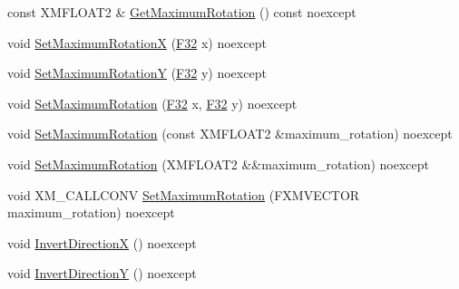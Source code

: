 \begin{DoxyCompactItemize}
\item 
const X\+M\+F\+L\+O\+A\+T2 \& \hyperlink{classmage_1_1script_1_1_mouse_look_script_afa39a7adab4c979ef6d78304f37a231f}{Get\+Maximum\+Rotation} () const noexcept
\item 
void \hyperlink{classmage_1_1script_1_1_mouse_look_script_a538d1d81ac4220a0e20e3e5de5c8e3a6}{Set\+Maximum\+RotationX} (\hyperlink{namespacemage_aa97e833b45f06d60a0a9c4fc22ae02c0}{F32} x) noexcept
\item 
void \hyperlink{classmage_1_1script_1_1_mouse_look_script_af56c4be26dde7497d53bb9f48d1b1a55}{Set\+Maximum\+RotationY} (\hyperlink{namespacemage_aa97e833b45f06d60a0a9c4fc22ae02c0}{F32} y) noexcept
\item 
void \hyperlink{classmage_1_1script_1_1_mouse_look_script_a50c3ddaad18713509394d168cddc8aa8}{Set\+Maximum\+Rotation} (\hyperlink{namespacemage_aa97e833b45f06d60a0a9c4fc22ae02c0}{F32} x, \hyperlink{namespacemage_aa97e833b45f06d60a0a9c4fc22ae02c0}{F32} y) noexcept
\item 
void \hyperlink{classmage_1_1script_1_1_mouse_look_script_a50090ac02670c2f23972e73f9d0660d8}{Set\+Maximum\+Rotation} (const X\+M\+F\+L\+O\+A\+T2 \&maximum\+\_\+rotation) noexcept
\item 
void \hyperlink{classmage_1_1script_1_1_mouse_look_script_a1f7a65b3e6318dbc71bf09c683560242}{Set\+Maximum\+Rotation} (X\+M\+F\+L\+O\+A\+T2 \&\&maximum\+\_\+rotation) noexcept
\item 
void X\+M\+\_\+\+C\+A\+L\+L\+C\+O\+NV \hyperlink{classmage_1_1script_1_1_mouse_look_script_a263e143e671ef56c04132b5e58d114a9}{Set\+Maximum\+Rotation} (F\+X\+M\+V\+E\+C\+T\+OR maximum\+\_\+rotation) noexcept
\item 
void \hyperlink{classmage_1_1script_1_1_mouse_look_script_aa527806c78873eab652dd6337a75b89f}{Invert\+DirectionX} () noexcept
\item 
void \hyperlink{classmage_1_1script_1_1_mouse_look_script_a189145ae96f56b805fe2020ed75db0bc}{Invert\+DirectionY} () noexcept
\end{DoxyCompactItemize}
